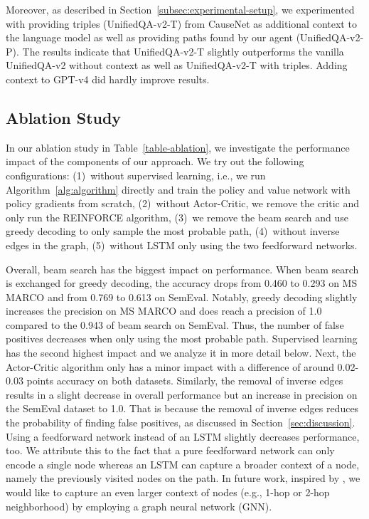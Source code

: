 Moreover, as described in Section~\ref{subsec:experimental-setup}, we experimented with providing triples (UnifiedQA-v2-T) from CauseNet as additional context to the language model as well as providing paths found by our agent (UnifiedQA-v2-P). The results indicate that UnifiedQA-v2-T slightly outperforms the vanilla UnifiedQA-v2 without context as well as UnifiedQA-v2-T with triples. Adding context to GPT-v4 did hardly improve results.


\subsection{Ablation Study}
\label{subsec:ablation-study}



In our ablation study in Table~\ref{table-ablation}, we investigate the performance impact of the components of our approach. We try out the following configurations:
(1)~without supervised learning, i.e., we run Algorithm~\ref{alg:algorithm} directly and train the policy and value network with 
policy gradients from scratch,
(2)~without Actor-Critic, we remove the critic and only run the 
REINFORCE algorithm,
(3)~we remove the beam search and use 
greedy decoding to only sample the most probable path,
(4)~without inverse edges in the graph,
(5)~without LSTM only using the two feedforward networks.

Overall, beam search has the biggest impact on performance. When beam search is exchanged for greedy decoding, the accuracy drops from 0.460 to 0.293 on MS MARCO and from 0.769 to 0.613 on SemEval. Notably, greedy decoding slightly increases the precision on MS MARCO and does reach a precision of 1.0 compared to the 0.943 of beam search on SemEval. Thus, the number of false positives decreases when only using the most probable path. Supervised learning has the second highest impact and we analyze it in more detail below. Next, the Actor-Critic algorithm only has a minor impact with a difference of around 0.02-0.03 points accuracy on both datasets. Similarly, the removal of inverse edges results in a slight decrease in overall performance but an increase in precision on the SemEval dataset to 1.0. That is because the removal of inverse edges reduces the probability of finding false positives, as discussed in Section~\ref{sec:discussion}. Using a feedforward network instead of an LSTM slightly decreases performance, too. We attribute this to the fact that a pure feedforward network can only encode a single node whereas an LSTM can capture a broader context of a node, namely the previously visited nodes on the path. In future work, inspired by \citet{Almasan2022DeepRL}, we would like to capture an even larger context of nodes (e.g., 1-hop or 2-hop neighborhood) by employing a graph neural network (GNN).

